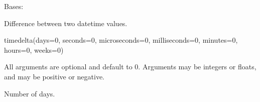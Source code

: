 \documentclass[letterpaper,10pt,english]{sphinxmanual}
\begin{document}
\begin{fulllineitems}
\label{\detokenize{modules/src.pig_sorting_api.main:src.pig_sorting_api.main.start_watcher_loop}}
\pysigstartsignatures
\pysiglinewithargsret
{}
{}
{}
\pysigstopsignatures
\end{fulllineitems}


\begin{fulllineitems}
\label{\detokenize{modules/src.pig_sorting_api.main:src.pig_sorting_api.main.timedelta}}
\pysigstartsignatures
\pysigline
{}
\pysigstopsignatures
\sphinxAtStartPar
Bases: 

\sphinxAtStartPar
Difference between two datetime values.

\sphinxAtStartPar
timedelta(days=0, seconds=0, microseconds=0, milliseconds=0, minutes=0, hours=0, weeks=0)

\sphinxAtStartPar
All arguments are optional and default to 0.
Arguments may be integers or floats, and may be positive or negative.

\begin{fulllineitems}
\label{\detokenize{modules/src.pig_sorting_api.main:src.pig_sorting_api.main.timedelta.days}}
\pysigstartsignatures
\pysigline
{}
\pysigstopsignatures
\sphinxAtStartPar
Number of days.

\end{fulllineitems}


\begin{fulllineitems}
\label{\detokenize{modules/src.pig_sorting_api.main:src.pig_sorting_api.main.timedelta.max}}
\pysigstartsignatures
\pysigline
{}
\pysigstopsignatures
\end{fulllineitems}


\end{fulllineitems}
\end{document}
